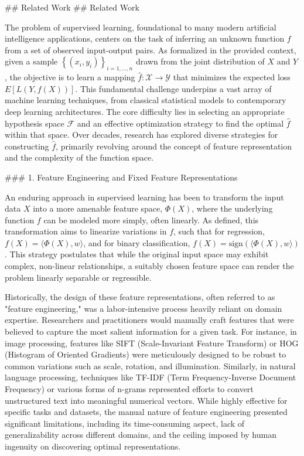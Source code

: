 \documentclass{article}
\begin{document}
\#\# Related Work
\#\# Related Work

The problem of supervised learning, foundational to many modern artificial intelligence applications, centers on the task of inferring an unknown function $f$ from a set of observed input-output pairs. As formalized in the provided context, given a sample $\left\{(x_i, y_i)\right\}_{i=1,...,n}$ drawn from the joint distribution of $X$ and $Y$, the objective is to learn a mapping $\hat{f} : \mathcal{X} \to \mathcal{Y}$ that minimizes the expected loss $E[L(Y, f(X))]$. This fundamental challenge underpins a vast array of machine learning techniques, from classical statistical models to contemporary deep learning architectures. The core difficulty lies in selecting an appropriate hypothesis space $\mathcal{F}$ and an effective optimization strategy to find the optimal $\hat{f}$ within that space. Over decades, research has explored diverse strategies for constructing $\hat{f}$, primarily revolving around the concept of feature representation and the complexity of the function space.

\#\#\# 1. Feature Engineering and Fixed Feature Representations

An enduring approach in supervised learning has been to transform the input data $X$ into a more amenable feature space, $\Phi(X)$, where the underlying function $f$ can be modeled more simply, often linearly. As defined, this transformation aims to linearize variations in $f$, such that for regression, $f(X) = \langle \Phi(X), w \rangle$, and for binary classification, $f(X) = \text{sign}(\langle \Phi(X), w \rangle)$. This strategy postulates that while the original input space may exhibit complex, non-linear relationships, a suitably chosen feature space can render the problem linearly separable or regressible.

Historically, the design of these feature representations, often referred to as "feature engineering," was a labor-intensive process heavily reliant on domain expertise. Researchers and practitioners would manually craft features that were believed to capture the most salient information for a given task. For instance, in image processing, features like SIFT (Scale-Invariant Feature Transform) \cite{1} or HOG (Histogram of Oriented Gradients) \cite{2} were meticulously designed to be robust to common variations such as scale, rotation, and illumination. Similarly, in natural language processing, techniques like TF-IDF (Term Frequency-Inverse Document Frequency) or various forms of n-grams represented efforts to convert unstructured text into meaningful numerical vectors. While highly effective for specific tasks and datasets, the manual nature of feature engineering presented significant limitations, including its time-consuming aspect, lack of generalizability across different domains, and the ceiling imposed by human ingenuity on discovering optimal representations.
\end{document}
